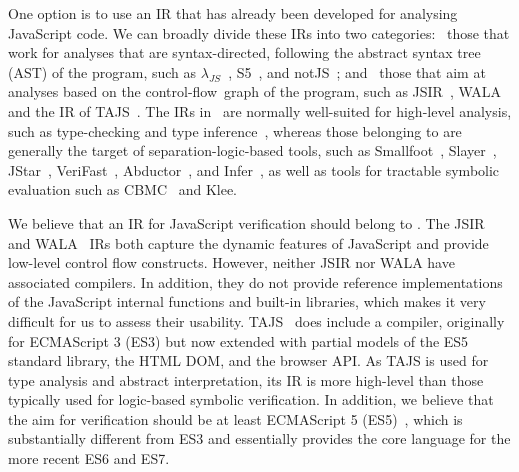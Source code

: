 \documentclass{llncs}
\newif\ifComments
\newcommand{\pg}[1]{%
\ifComments
\begin{center}
\fbox{%
\begin{minipage}{\textwidth} \color{red}
{\bf PG:} {\rm #1}
\end{minipage}
}
\end{center}
\fi
}
\begin{document}



One option is to use an IR that has already been developed for
analysing JavaScript code.
 We can broadly divide these IRs into two categories: ~those that work for analyses that are
syntax-directed, following the abstract syntax tree (AST) of the
program, such as $\lambda_{JS}$~\cite{guha:ecoop:2010}, S5~\cite{s5},
and notJS~\cite{kashyap:fse:14}; and 
~those that aim at analyses based on the control-flow~graph of the program, such as JSIR~\cite{jsir}, WALA~\cite{wala,sridharan:ecoop:12} and the IR of TAJS~\cite{jensen:sas:2009,andreasen:oopsla:2014}.
The IRs in~ are normally well-suited for high-level analysis, such as type-checking and type inference~\cite{guha:ecoop:2010,s5}, whereas those belonging to  are generally the target of separation-logic-based
tools, such as Smallfoot~\cite{smallf}, Slayer~\cite{slayerp}, JStar~\cite{jstar}, VeriFast~\cite{jacobs2011verifast}, Abductor~\cite{abductor}, and Infer~\cite{calcagno2015moving}, as well as tools for tractable symbolic evaluation such as CBMC~\cite{kt2014-tacas} and Klee\cite{Klee}. 

We believe that an IR for JavaScript verification should belong to
. 
The JSIR~\cite{jsir}  and WALA~\cite{wala,sridharan:ecoop:12} IRs  both capture the dynamic features  of
JavaScript and provide low-level control flow constructs. However,
neither JSIR nor WALA have associated compilers. In addition, they  do not provide  reference implementations of the JavaScript
internal functions and built-in libraries, which makes it very difficult
for us to assess their usability.
TAJS~\cite{jensen:sas:2009,andreasen:oopsla:2014}  does include a
compiler, originally for ECMAScript 3 (ES3) but now extended with partial models of
the ES5 standard library, the HTML DOM, and the browser API. 
As TAJS is used for
type analysis and abstract interpretation, its IR is more
high-level than those typically used for logic-based symbolic
verification. In addition, we believe that the aim for verification 
should be at least ECMAScript 5 (ES5)~\cite{ecma}, 
which is substantially different from ES3 and
essentially provides the core language for the more recent ES6 and ES7. 
\end{document}
